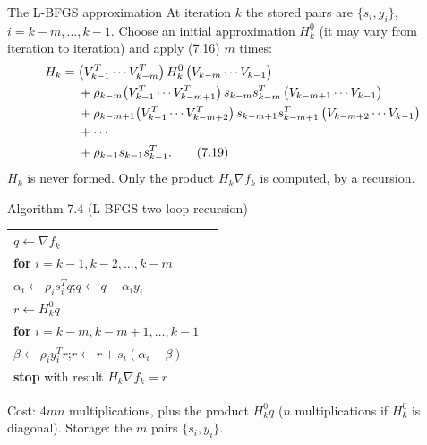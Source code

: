 \documentclass[aspectratio=169,12pt]{beamer}
\makeatletter
\newcommand{\gradf}{\nabla f}
\newcommand{\la}{\leftarrow}
\newcommand{\algostretch}{1.12}
\newenvironment{algo}{\par\renewcommand{\arraystretch}{\algostretch}%
  \begin{tabular}{@{}l@{\hspace{2.2em}}l@{}}}{\end{tabular}\par}
\makeatother
\begin{document}
\begin{frame}{The L-BFGS approximation}
  At iteration $k$ the stored pairs are $\{s_{i},y_{i}\}$, $i=k-m,\dots,k-1$. Choose an initial
  approximation $H_{k}^{0}$ (it may vary from iteration to iteration) and apply (7.16)
  $m$ times:
  \begin{align}
    H_{k}={}&\big(V_{k-1}^{T}\cdots V_{k-m}^{T}\big)\,H_{k}^{0}\,\big(V_{k-m}\cdots V_{k-1}\big) \notag\\
    &+\rho_{k-m}\big(V_{k-1}^{T}\cdots V_{k-m+1}^{T}\big)\,s_{k-m}s_{k-m}^{T}\,\big(V_{k-m+1}\cdots V_{k-1}\big) \notag\\
    &+\rho_{k-m+1}\big(V_{k-1}^{T}\cdots V_{k-m+2}^{T}\big)\,s_{k-m+1}s_{k-m+1}^{T}\,\big(V_{k-m+2}\cdots V_{k-1}\big) \notag\\
    &+\cdots \notag\\
    &+\rho_{k-1}s_{k-1}s_{k-1}^{T} . \tag{7.19}
  \end{align}
  $H_{k}$ is never formed. Only the product $H_{k}\gradf_{k}$ is computed, by a recursion.
\end{frame}

\begin{frame}{Algorithm 7.4 (L-BFGS two-loop recursion)}
  \begin{block}{}
    \begin{algo}
      $q\la\gradf_{k}$ & \\
      \textbf{for} $i=k-1,k-2,\dots,k-m$ & \\
      \qquad $\alpha_{i}\la\rho_{i}s_{i}^{T}q$;\qquad $q\la q-\alpha_{i}y_{i}$ & \\
      $r\la H_{k}^{0}q$ & \\
      \textbf{for} $i=k-m,k-m+1,\dots,k-1$ & \\
      \qquad $\beta\la\rho_{i}y_{i}^{T}r$;\qquad $r\la r+s_{i}(\alpha_{i}-\beta)$ & \\
      \textbf{stop} with result $H_{k}\gradf_{k}=r$ & \\
    \end{algo}
  \end{block}

  Cost: \alert{$4mn$ multiplications}, plus the product $H_{k}^{0}q$ ($n$ multiplications if $H_{k}^{0}$ is
  diagonal). Storage: the $m$ pairs $\{s_{i},y_{i}\}$.
\end{frame}
\end{document}
